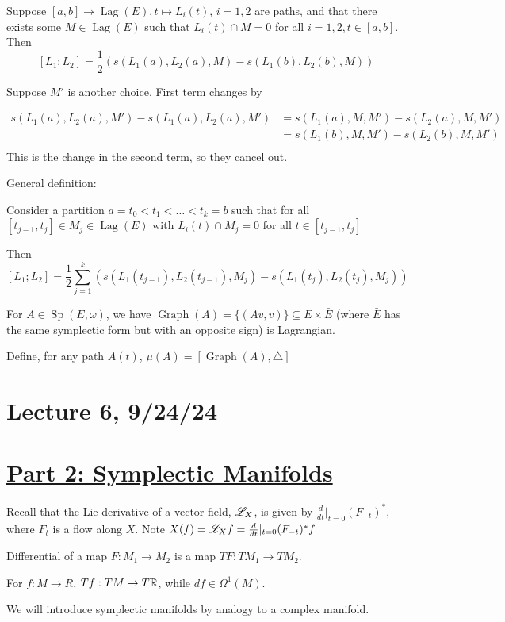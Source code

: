 \documentclass[x11names,reqno,14pt]{extarticle}
\newcommand{\dd}[2]{\frac{d#1}{d#2}}
\newcommand{\spew}{\Sp(E,\omega)}
\DeclareMathOperator{\Sp}{Sp}
\DeclareMathOperator{\Lag}{Lag}
\begin{document}
\prop

Suppose $[a,b]\to\Lag(E), t \mapsto L_i(t)$, $i = 1, 2$ are paths, and that there exists some $M\in\Lag(E)$ such that $L_i(t) \cap M = 0$ for all $i = 1, 2, t \in [a,b]$. Then
\[
[L_1;L_2] = \frac12(s(L_1(a),L_2(a),M) - s(L_1(b),L_2(b),M))
\]

\proof

Suppose $M'$ is another choice. First term changes by 

\begin{align*}s(L_1(a),L_2(a),M') - s(L_1(a),L_2(a),M')  &= s(L_1(a),M,M') - s(L_2(a),M,M') \\
& = s(L_1(b),M,M') - s(L_2(b),M,M') \\
\end{align*}
This is the change in the second term, so they cancel out.

General definition: 

Consider a partition $a = t_0 < t_1 < \dots < t_k = b$ such that for all $[t_{j-1},t_j] \in M_j\in\Lag(E)$ with $L_i(t) \cap M_j = 0$ for all $t \in [t_{j-1},t_j]$

Then 
\[
[L_1;L_2] = \frac12\sum_{j=1}^k\left(s(L_1(t_{j-1}),L_2(t_{j-1}),M_j) - s(L_1(t_j),L_2(t_j),M_j)\right)
\]

For $A\in\spew$, we have $\operatorname{Graph}(A) = \{(Av,v)\}\subseteq E\times \bar{E}$ (where $\bar{E}$ has the same symplectic form but with an opposite sign) is Lagrangian. 

Define, for any path $A(t)$, $\mu(A) = [\operatorname{Graph}(A), \bigtriangleup]$

\section*{Lecture 6, 9/24/24}

\section*{\underline{Part 2: Symplectic Manifolds}}

Recall that the Lie derivative of a vector field, $\mathscr{L}_X$, is given by $\dd{}{t}|_{t=0}(F_{-t})^*$, where $F_t$ is a flow along $X$. Note $X(f) = \ms{L}_Xf = \dd{}{t}|_{t=0}(F_{-t})^*f$

Differential of a map $F:M_1\to M_2$ is a map $TF:TM_1\to TM_2$.

For $f:M\to R$, $Tf:TM\to T\mathbb{R}$, while $df\in\Omega^1(M)$.

We will introduce symplectic manifolds by analogy to a complex manifold. 
\end{document}

